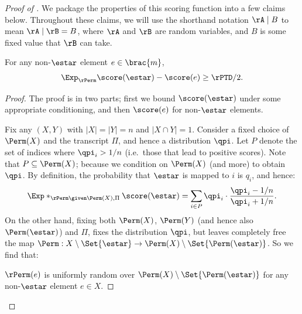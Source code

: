 \begin{proof}[Proof of ]
We package the properties of this scoring function into a few claims below.
Throughout these claims, we will use the shorthand notation
$\rA \mid B$ to mean $\rA \mid \rB = B$, where $\rA$ and $\rB$ are random
variables, and $B$ is some fixed value that $\rB$ can take.

\begin{claim}\label{clm:exp-score-diff}
  For any non-$\estar$ element $e \in \brac{m}$,
  \[ \Exp_{\rPerm} {\score(\estar) - \score(e)} \geq \rPTD / 2. \]
\end{claim}

\begin{proof}
  The proof is in two parts; first we bound $\score(\estar)$ under some
  appropriate conditioning, and then $\score(e)$ for non-$\estar$ elements.

  \noindent
  Fix any $(X,Y)$ with $|X| = |Y| = n$ and $|X\cap Y| = 1$.
  Consider a fixed choice of $\Perm(X)$ and the transcript $\Pi$, and hence
  a distribution $\qpi$.
  Let $P$ denote the set of indices where $\qpi_i > 1/n$ (i.e.\ those that lead
  to positive scores).
  Note that $P \subseteq \Perm(X)$; because we condition on $\Perm(X)$
  (and more) to obtain $\qpi$.
  By definition, the probability that $\estar$ is mapped to $i$ is $q_i$, and
  hence:
  \[
    \Exp*_{\rPerm \given \Perm(X), \Pi} {\score(\estar)}
    = \sum_{i \in P} \qpi_i \cdot \frac{\qpi_i - 1/n}{\qpi_i + 1/n}.
  \]
  On the other hand, fixing both $\Perm(X)$, $\Perm(Y)$ (and hence
  also $\Perm(\estar)$) and $\Pi$, fixes the distribution $\qpi$,
  but leaves completely free the map
  $\Perm: X \setminus \Set{\estar} \to \Perm(X) \setminus \Set{\Perm(\estar)}$.
  So we find that:
 
    $\rPerm(e)$ is uniformly random over
      $\Perm(X) \setminus \Set{\Perm(\estar)}$ for any non-$\estar$ element
      $e \in X$.
  

\end{proof}
\end{proof}

